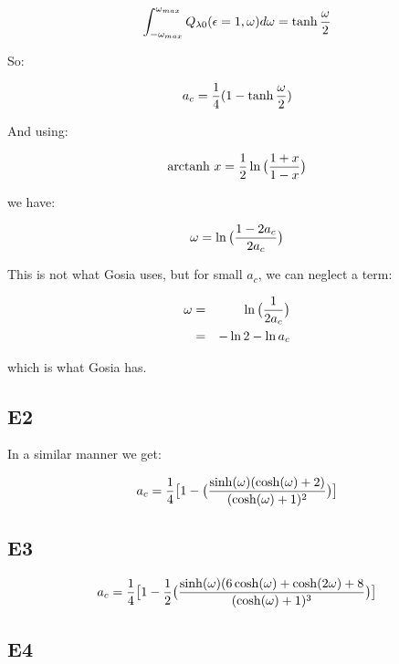 \begin{equation}
{\displaystyle \int_{-\omega_{max}}^{\omega_{max}} Q_{\lambda
0}(\epsilon = 1, \omega) d\omega} =
\tanh{\omega \over 2}
\end{equation}

\noindent So:

\begin{equation}
a_c = {1 \over 4}(1 - \tanh{\omega \over 2})
\end{equation}

\noindent And using:

\begin{equation}
\textrm{arctanh}~ x = {1 \over 2} \ln\big({1 + x \over 1 - x}\big)
\end{equation}

\noindent we have:

\begin{equation}
\omega = \ln \big({1 - 2 a_c \over 2 a_c}\big)
\end{equation}

\noindent This is not what Gosia uses, but for small $a_c$, we can
neglect a term:

\begin{eqnarray}
\omega &=& \ln \big({1 \over 2 a_c}\big)\nonumber\\
&=& -\ln 2 - \ln a_c
\end{eqnarray}

\noindent which is what Gosia has.

\subsection{E2}

\noindent In a similar manner we get:

\begin{equation}
a_c = {1 \over 4} \big[1 - \big({\sinh(\omega) (\cosh(\omega) + 2) \over
(\cosh(\omega) + 1)^2}\big)\big]
\end{equation}

\subsection{E3}

\begin{equation}
a_c = {1 \over4} \big[1 - {1 \over 2}\big({\sinh(\omega) (6 \cosh(\omega) +
\cosh(2\omega) + 8 \over (\cosh(\omega) + 1)^3} \big)\big]
\end{equation}

\subsection{E4}

